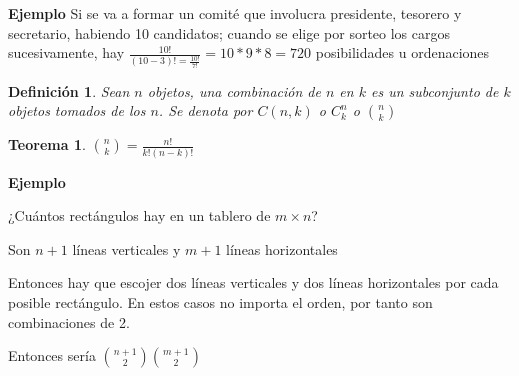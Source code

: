 \documentclass[a4paper,12pt]{report}
\newtheorem*{teo}{Teorema}
\newtheorem*{dfn}{Definición}
\begin{document}
\textbf{Ejemplo}
 Si se va a formar un comité que involucra presidente, tesorero y secretario, habiendo 10 candidatos; cuando se elige por sorteo los cargos sucesivamente, hay $\frac{10!}{(10-3)!=\frac{10!}{7!}}=10*9*8=720$ posibilidades u ordenaciones




\begin{dfn}
 Sean $n$ objetos, una combinación de $n$ en $k$ es un subconjunto de $k$ objetos tomados de los $n$. Se denota por $C(n,k)$ o $C^n_k$ o ${n}\choose{k}$  
\end{dfn}

\begin{teo}
 ${n}\choose{k}$$=\frac{n!}{k!(n-k)!}$  
\end{teo}


\textbf{Ejemplo}

¿Cuántos rectángulos hay en un tablero de $m\times n$?

Son $n+1$ líneas verticales y $m+1$ líneas horizontales

Entonces hay que escojer dos líneas verticales y dos líneas horizontales por cada posible rectángulo. En estos casos no importa el orden, por tanto son combinaciones de 2.

Entonces sería ${n+1}\choose{2}$${m+1}\choose{2}$
\end{document}

